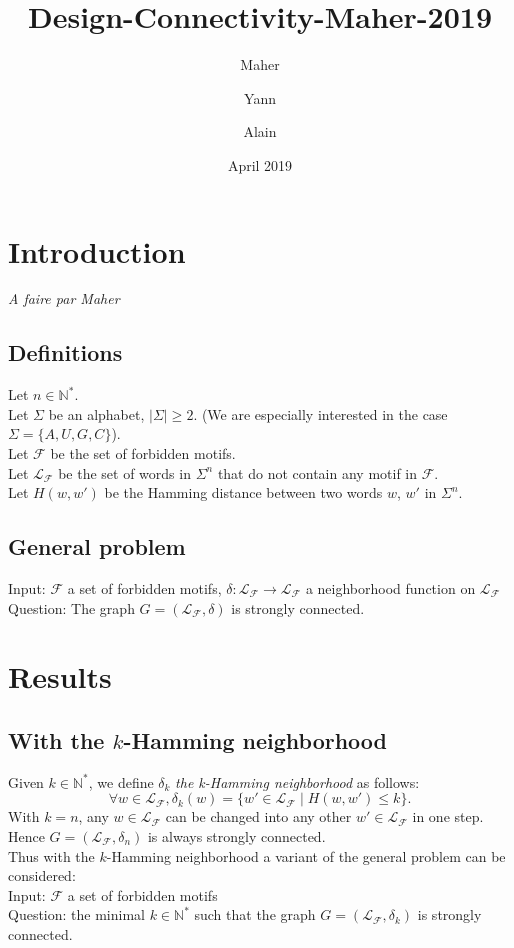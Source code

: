 \documentclass{article}
\title{Design-Connectivity-Maher-2019}
\author{Maher \and Yann \and Alain}
\date{April 2019}
\begin{document}
\maketitle

\newtheorem{result}{Result}

\newcommand{\PosInt}{\mathbb{N}^*}
\newcommand{\Forb}{\mathcal{F}}
\newcommand{\Lang}[1]{\mathcal{L}_{#1}}
\newcommand{\Hamming}[2]{H(#1,#2)}



\section{Introduction}
{\it A faire par Maher}

\subsection*{Definitions}

Let $n \in \PosInt$. \\
Let $\Sigma$ be an alphabet, $|\Sigma| \geq 2$. (We are especially interested in the case $\Sigma = \{A, U, G, C\}$). \\
Let $\Forb$ be the set of forbidden motifs. \\
Let $\Lang{\Forb}$ be the set of words in $\Sigma^n$ that do not contain any motif in $\Forb$. \\
Let $H(w,w')$ be the Hamming distance between two words $w$, $w'$ in $\Sigma^n$.

\subsection*{General problem}

Input: $\Forb$ a set of forbidden motifs, $\delta: \Lang{\Forb} \rightarrow \Lang{\Forb}$ a neighborhood function on $\Lang{\Forb}$ \\
Question: The graph $G = (\Lang{\Forb}, \delta)$ is strongly connected.

\section{Results}
\subsection{With the $k$-Hamming neighborhood}

Given $k \in \PosInt$, we define $\delta_k$ {\it the k-Hamming neighborhood} as follows:
$$\forall w \in \Lang{\Forb},  \delta_k(w) = \{w'\in \mathcal{L}_{\Forb} \mid \Hamming{w}{w'}\le k\}. $$
With $k = n$, any $w \in \Lang{\Forb}$ can be changed into any other $w' \in \Lang{\Forb}$ in one step. Hence $G = (\Lang{\Forb}, \delta_n)$ is always strongly connected. \\
Thus with the $k$-Hamming neighborhood a variant of the general problem can be considered: \\
\newline
Input: $\Forb$ a set of forbidden motifs \\
Question: the minimal $k \in \PosInt$ such that the graph $G = (\Lang{\Forb}, \delta_k)$ is strongly connected.
\end{document}
